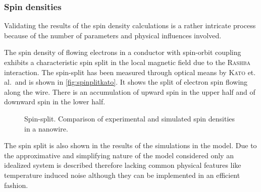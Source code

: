 \subsubsection{Spin densities}
Validating the results of the spin density calculations is a rather intricate process because of the number of parameters and physical influences involved.\par
The spin density of flowing electrons in a conductor with spin-orbit coupling exhibits a characteristic spin split in the local magnetic field due to the \textsc{Rashba} interaction.
The spin-split has been measured through optical means by \textsc{Kato} et. al.\,\cite{Kato2004Science} and is shown in \cref{fig:spinplitkato}. It shows the split of electron spin flowing along the wire. There is an accumulation of upward spin in the upper half and of downward spin in the lower half.\par
\begin{figure}[h]
  \begin{center}
    \qquad
    \qquad
    \caption{Spin-split. Comparison of experimental and simulated spin densities in a nanowire.}
  \end{center}
\end{figure}
The spin split is also shown in the results of the simulations in the \gfnc{} model. Due to the approximative and simplifying nature of the model considered only an idealized system is described therefore lacking common physical features like temperature induced noise although they can be implemented in an efficient fashion.\par
\FloatBarrier
